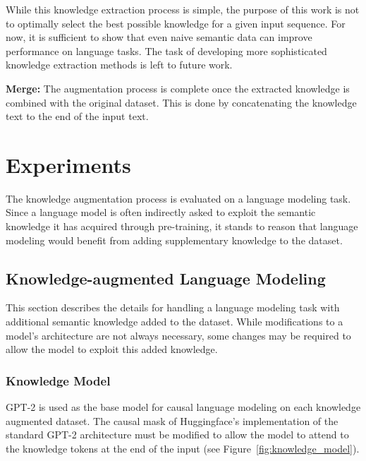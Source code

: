 \documentclass[phd,electronic,oneside,twosidetoc,letterpaper,chaptercenter,parttop,lof]{byumsphd}
\begin{document}
While this knowledge extraction process is simple, the purpose of this work is not to optimally select the best possible knowledge for a given input sequence. 
For now, it is sufficient to show that even naive semantic data can improve performance on language tasks.
The task of developing more sophisticated knowledge extraction methods is left to future work.

\textbf{Merge:}
The augmentation process is complete once the extracted knowledge is combined with the original dataset. 
This is done by concatenating the knowledge text to the end of the input text.
        
    
\section{Experiments}

The knowledge augmentation process is evaluated on a language modeling task.
Since a language model is often indirectly asked to exploit the semantic knowledge it has acquired through pre-training, it stands to reason that language modeling would benefit from adding supplementary knowledge to the dataset.

\subsection{Knowledge-augmented Language Modeling}

This section describes the details for handling a language modeling task with additional semantic knowledge added to the dataset.
While modifications to a model's architecture are not always necessary, some changes may be required to allow the model to exploit this added knowledge.

\subsubsection{Knowledge Model}

GPT-2 is used as the base model for causal language modeling on each knowledge augmented dataset. 
The causal mask of Huggingface's \cite{wolf2019huggingface} implementation of the standard GPT-2 architecture must be modified to allow the model to attend to the knowledge tokens at the end of the input (see Figure~\ref{fig:knowledge_model}).
        
\end{document}
